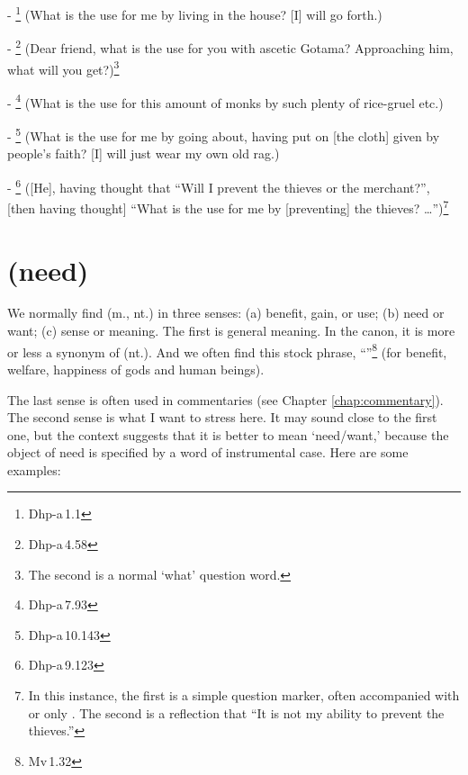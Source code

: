 - \footnote{Dhp-a\,1.1} (What is the use for me by living in the house? [I] will go forth.)\par
- \footnote{Dhp-a\,4.58} (Dear friend, what is the use for you with ascetic Gotama? Approaching him, what will you get?)\footnote{The second  is a normal `what' question word.}\par
- \footnote{Dhp-a\,7.93} (What is the use for this amount of monks by such plenty of rice-gruel etc.)\par
- \footnote{Dhp-a\,10.143} (What is the use for me by going about, having put on [the cloth] given by people's faith? [I] will just wear my own old rag.)\par
- \footnote{Dhp-a\,9.123} ([He], having thought that ``Will I prevent the thieves or the merchant?'', [then having thought] ``What is the use for me by [preventing] the thieves? \ldots'')\footnote{In this instance, the first  is a simple question marker, often accompanied with  or only . The second  is a reflection that ``It is not my ability to prevent the thieves.''}\par

{}
\section*{ (need)}

We normally find  (m., nt.) in three senses: (a) benefit, gain, or use; (b) need or want; (c) sense or meaning. The first is general meaning. In the canon, it is more or less a synonym of  (nt.). And we often find this stock phrase, ``''\footnote{Mv\,1.32} (for benefit, welfare, happiness of gods and human beings).

The last sense is often used in commentaries (see Chapter \ref{chap:commentary}). The second sense is what I want to stress here. It may sound close to the first one, but the context suggests that it is better to mean `need/want,' because the object of need is specified by a word of instrumental case. Here are some examples:

